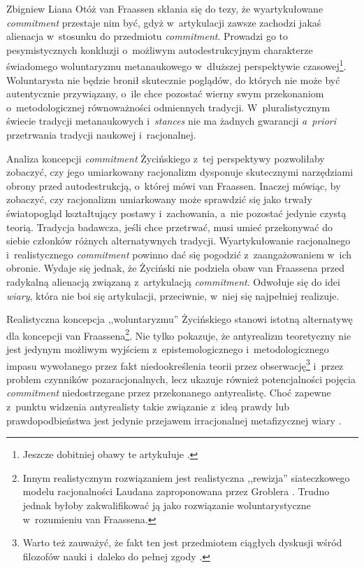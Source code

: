 \begin{artplenv}{Zbigniew Liana}
Otóż van Fraassen
\parencite*[][s.~157n]{van_fraassen_stance_2011} %
 skłania się do tezy, że wyartykułowane \textit{commitment} przestaje nim być, gdyż w~artykulacji zawsze zachodzi jakaś alienacja w~stosunku do przedmiotu \textit{commitment}. Prowadzi go to pesymistycznych konkluzji o~możliwym autodestrukcyjnym charakterze świadomego woluntaryzmu metanaukowego w~dłuższej perspektywie czasowej\footnote{Jeszcze dobitniej obawy te artykułuje 
\parencite[][s.~65]{teller_learning_2011}.%
}. Woluntarysta nie będzie bronił skutecznie poglądów, do których nie może być autentycznie przywiązany, o~ile chce pozostać wierny swym przekonaniom o~metodologicznej równoważności odmiennych tradycji. W~pluralistycznym świecie tradycji metanaukowych i~\textit{stances} nie ma żadnych gwarancji \textit{a~priori} przetrwania tradycji naukowej i~racjonalnej.

Analiza koncepcji \textit{commitment} Życińskiego z~tej perspektywy pozwoliłaby zobaczyć, czy jego umiarkowany racjonalizm dysponuje skutecznymi narzędziami obrony przed autodestrukcją, o~której mówi van Fraassen. Inaczej mówiąc, by zobaczyć, czy racjonalizm umiarkowany może sprawdzić się jako trwały światopogląd kształtujący postawy i~zachowania, a~nie pozostać jedynie czystą teorią. Tradycja badawcza, jeśli chce przetrwać, musi umieć przekonywać do siebie członków różnych alternatywnych tradycji. Wyartykułowanie racjonalnego i~realistycznego \textit{commitment} powinno dać się pogodzić z~zaangażowaniem w~ich obronie. Wydaje się jednak, że Życiński nie podziela obaw van Fraassena przed radykalną alienacją związaną z~artykulacją \textit{commitment}. Odwołuje się do idei \textit{wiary}, która nie boi się artykulacji, przeciwnie, w~niej się najpełniej realizuje.

Realistyczna koncepcja ,,woluntaryzmu'' Życińskiego stanowi istotną alternatywę dla koncepcji van Fraassena\footnote{Innym realistycznym rozwiązaniem jest realistyczna ,,rewizja'' siateczkowego modelu racjonalności Laudana zaproponowana przez Groblera
\parencite*[][s.~35nn]{grobler_prawda_1993}. %
 Trudno jednak byłoby zakwalifikować ją jako rozwiązanie woluntarystyczne w~rozumieniu van Fraassena.}. Nie tylko pokazuje, że antyrealizm teoretyczny nie jest jedynym możliwym wyjściem z~epistemologicznego i~metodologicznego impasu wywołanego przez fakt niedookreślenia teorii przez obserwację\footnote{Warto też zauważyć, że fakt ten jest przedmiotem ciągłych dyskusji wśród filozofów nauki i~daleko do pełnej zgody 
\parencite[zob.][]{stanford_underdetermination_2017}.%
} i~przez problem czynników pozaracjonalnych, lecz ukazuje również potencjalności pojęcia \textit{commitment} niedostrzegane przez przekonanego antyrealistę. Choć zapewne z~punktu widzenia antyrealisty takie związanie z~ideą prawdy lub prawdopodbieństwa jest jedynie przejawem irracjonalnej metafizycznej wiary 
\parencite[][s.~41n]{chakravartty_puzzle_2011}.%



\end{artplenv}
